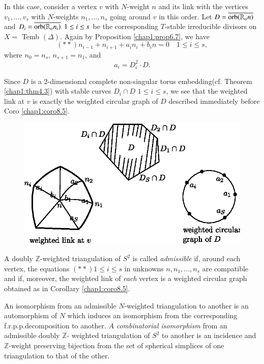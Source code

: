  In this  case, consider a vertex $v$ with $N$-weight $n$
 and  its link with the vertices $v_1, \ldots , v_s$ with $N$-weights
 $n_1, \ldots , n_s$ going  around $v$ in this order. Let $D =
 \overline{\operatorname{orb} (\mathbb{R}_on)}$ and $D_i = \overline{\operatorname{orb}
   (\mathbb{R}_on_i)} ~ ~ 1\leq i  \leq s $ be the corresponding
 $T$-stable irreducible divisors on $X = 
 $ Temb $(\Delta)$. Again by Proposition \ref{chap1:prop6.7}, we have 
 $$
 (**) n_{i-1} + n_{i+1} + a_in_i +b_in = 0 \quad 1 \leq i \leq s, 
 $$
 where $n_0 = n_s$, $n_{s+1} = n_1$, and 
$$
a_i = D^2_i \cdot D.
$$
 
 \noindent
 Since $D$ is  a 2-dimensional complete non-singular torus
 embedding\pageoriginale (cf. Theorem \ref{chap1:thm4.3}) with stable curves $D_i
 \cap D$  $1 \leq i \leq s$, we see that the weighted link at $v$ is
 exactly the weighted circular graph of $D$ described immediately
 before Coro \ref{chap1:coro8.5}.  
\begin{figure}[H]
\centering 
\includegraphics{vol58-fig/fig58-22.eps} 
\end{figure}
 
 \begin{defi*}
A doubly $\mathbb{Z}$-weighted triangulation of $S^2$ is called
\textit{admissible} if, around each vertex, the equations $(**) 1 \leq
i \leq s$ in unknowns  $n, n_1 ,\ldots , n_s$ are compatible and if,
moreover, the weighted link of \textit{each} vertex is a weighted
circular graph obtained as in Corollary \ref{chap1:coro8.5}. 
 \end{defi*} 

\begin{defi*}
An isomorphism from an admissible $N$-weighted triangulation to
another is  an  automorphism of $N$ which induces an isomorphism
from the corresponding f.r.p.p.decomposition to another. $A$
\textit{combinatorial isomorphism} from an admissible doubly
$\mathbb{Z}$- weighted triangulation of $S^2$ to another is an
incidence and $\mathbb{Z}$-weight preserving bijection from the set of
spherical simplices of one triangulation to that of the other. 
\end{defi*}

